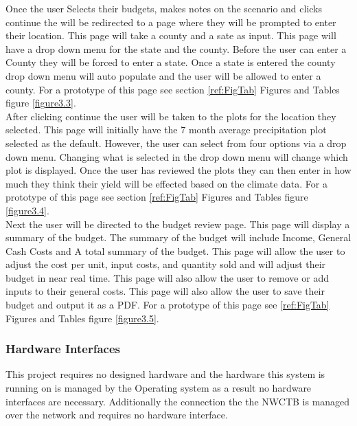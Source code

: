 \documentclass[onecolumn, draftclsnofoot,10pt, compsoc]{article}
\begin{document}
					Once the user Selects their budgets, makes notes on the scenario and clicks continue the will be redirected to a page where they will be prompted to enter their location. This page will take a county and a sate as input. This page will have a drop down menu for the state and the county. Before the user can enter a County they will be forced to enter a state. Once a state is entered the county drop down menu will auto populate and the user will be allowed to enter a county. For a prototype of this page see section \ref{ref:FigTab} Figures and Tables figure \ref{figure3.3}.\\

					After clicking continue the user will be taken to the plots for the location they selected. This page will initially have the 7 month average precipitation plot selected as the default. However, the user can select from four options via a drop down menu. Changing what is selected in the drop down menu will change which plot is displayed. Once the user has reviewed the plots they can then enter in how much they think their yield will be effected based on the climate data. For a prototype of this page see section \ref{ref:FigTab} Figures and Tables figure \ref{figure3.4}.\\
					
					Next the user will be directed to the budget review page. This page will display a summary of the budget. The summary of the budget will include Income, General Cash Costs and A total summary of the budget. This page will allow the user to adjust the cost per unit, input costs, and quantity sold and will adjust their budget in near real time. This page will also allow the user to remove or add inputs to their general costs. This page will also allow the user to save their budget and output it as a PDF. For a prototype of this page see \ref{ref:FigTab} Figures and Tables figure \ref{figure3.5}.\\
					

        \subsubsection{Hardware Interfaces}
					This project requires no designed hardware and the hardware this system is running on is managed by the Operating system as a result no hardware interfaces are necessary. Additionally the connection the the NWCTB is managed over the network and requires no hardware interface.\\
\end{document}

